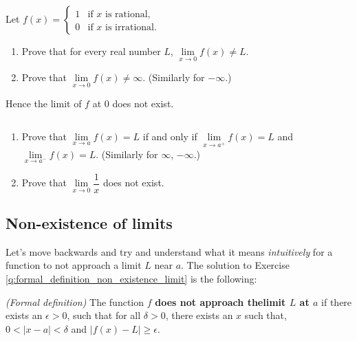 \begin{exercise}
	\label{q:rational_irrational_discontinuity}
	Let $
		f(x) = \begin{cases}
			1 & \mbox{if $x$ is rational,}   \\
			0 & \mbox{if $x$ is irrational.}
		\end{cases}
	$
	\begin{enumerate}
		\item Prove that for every real number $L$, $\lim \limits_{x \rightarrow 0} f(x) \neq L$.
		\item Prove that $\lim \limits_{x \rightarrow 0} f(x) \neq \infty$. (Similarly for $-\infty$.)
	\end{enumerate}
	Hence the limit of $f$ at $0$ does not exist.
\end{exercise}

\begin{exercise}$ $
	\begin{enumerate}
		\item Prove that $\lim \limits_{x \rightarrow a} f(x) = L$ if and only if $\lim \limits_{x \rightarrow a^+} f(x) = L$ and $\lim \limits_{x \rightarrow a^-} f(x) = L$.
		      (Similarly for $\infty$, $-\infty$.)

		\item Prove that $\lim \limits_{x \rightarrow 0} \dfrac{1}{x}$ does not exist.
	\end{enumerate}
\end{exercise}


\subsection{Non-existence of limits}

Let's move backwards and try and understand what it means {\it intuitively} for a function to not approach a limit $L$ near $a$. The solution to Exercise \ref{q:formal_definition_non_existence_limit} is the following:\\

\begin{indentPara}
	{\it (Formal definition)} The function $f$ \textbf{does not approach thelimit $L$ at $a$} if there exists an $\epsilon > 0$, such that for all $\delta > 0$, there exists an $x$ such that, $0 < |x - a | < \delta$ and $|f(x) - L| \ge \epsilon$.\\
\end{indentPara}

